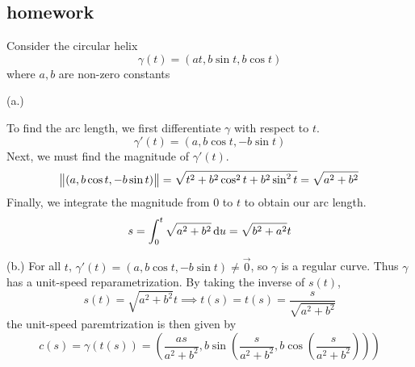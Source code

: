 \subsection{homework}
  \begin{problem}
    Consider the circular helix
    \[
\gamma(t) = (at, b \sin t, b \cos t)
\]
    where \(a, b\) are non-zero constants
  \end{problem}
  \begin{solution}
  \item[(a.)]

    To find the arc length, we first differentiate \(\gamma\) with respect to \(t\).
    \[
\gamma'(t) = (a, b \cos t, -b \sin t)
\]
    Next, we must find the magnitude of \(\gamma'(t)\).
    \[
\norm{(a, b \cos t, -b \sin t)} = \sqrt{t^{2} + b^{2} \cos^{2} t +
        b^{2} \sin^{2} t} = \sqrt{a^{2} + b^{2}}
\]
    Finally, we integrate the magnitude from \(0\) to
    \(t\) to obtain our arc length.
    \[
s = \int^{t}_{0} \sqrt{a^{2} + b^{2}} \dif u = \sqrt{b^{2}+a^{2}}t
\]

  \item[(b.)]
    For all \(t\), \(\gamma'(t) = (a, b \cos t, -b \sin t) \not = \vec{0}\), so \(\gamma\) is
    a regular curve. Thus \(\gamma\) has a unit-speed reparametrization. By taking the
    inverse of \(s(t)\),
    \[
s(t) = \sqrt{a^{2}+b^{2}}t \implies t(s) = t(s) = \frac{s}{\sqrt{a^{2}+b^{2}}}
\]
    the unit-speed paremtrization is then given by
    \[
c(s) = \gamma(t(s)) = (\frac{as}{a^{2}+b^{2}}, b\sin(\frac{s}{a^{2}+b^{2}}, b\cos(\frac{s}{a^{2}+b^{2}})))
\]


\end{solution}
